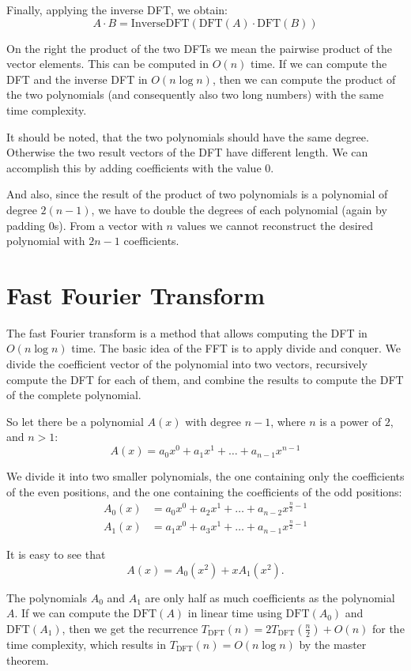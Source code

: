 \documentclass{article}
\begin{document}
Finally, applying the inverse DFT, we obtain:
$$A \cdot B = \text{InverseDFT}(\text{DFT}(A) \cdot \text{DFT}(B))$$

On the right the product of the two DFTs we mean the pairwise product of the vector elements. This can be computed in $O(n)$ time. If we can compute the DFT and the inverse DFT in $O(n \log n)$, then we can compute the product of the two polynomials (and consequently also two long numbers) with the same time complexity.

It should be noted, that the two polynomials should have the same degree. Otherwise the two result vectors of the DFT have different length. We can accomplish this by adding coefficients with the value $0$.

And also, since the result of the product of two polynomials is a polynomial of degree $2 (n - 1)$, we have to double the degrees of each polynomial (again by padding $0$s). From a vector with $n$ values we cannot reconstruct the desired polynomial with $2n - 1$ coefficients.

\section{Fast Fourier Transform}

The fast Fourier transform is a method that allows computing the DFT in $O(n \log n)$ time. The basic idea of the FFT is to apply divide and conquer. We divide the coefficient vector of the polynomial into two vectors, recursively compute the DFT for each of them, and combine the results to compute the DFT of the complete polynomial.

So let there be a polynomial $A(x)$ with degree $n - 1$, where $n$ is a power of $2$, and $n > 1$:
$$A(x) = a_0 x^0 + a_1 x^1 + \dots + a_{n-1} x^{n-1}$$

We divide it into two smaller polynomials, the one containing only the coefficients of the even positions, and the one containing the coefficients of the odd positions:
$$\begin{align} A_0(x) &= a_0 x^0 + a_2 x^1 + \dots + a_{n-2} x^{\frac{n}{2}-1} \\ A_1(x) &= a_1 x^0 + a_3 x^1 + \dots + a_{n-1} x^{\frac{n}{2}-1} \end{align}$$

It is easy to see that
$$A(x) = A_0(x^2) + x A_1(x^2).$$

The polynomials $A_0$ and $A_1$ are only half as much coefficients as the polynomial $A$. If we can compute the $\text{DFT}(A)$ in linear time using $\text{DFT}(A_0)$ and $\text{DFT}(A_1)$, then we get the recurrence $T_{\text{DFT}}(n) = 2 T_{\text{DFT}}\left(\frac{n}{2}\right) + O(n)$ for the time complexity, which results in $T_{\text{DFT}}(n) = O(n \log n)$ by the master theorem.
\end{document}
